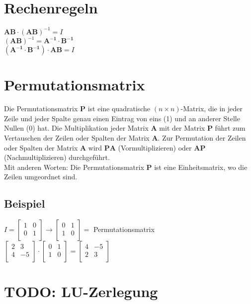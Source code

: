 \documentclass[../main.tex]{subfiles}
\begin{document}
\section{Rechenregeln}
$\mathbf{AB}\cdot(\mathbf{AB})^{-1}=I$ \\ [7pt]
$(\mathbf{AB})^{-1} = \mathbf{A^{-1} \cdot B^{-1}}$ \\ [7pt]
$(\mathbf{A^{-1} \cdot B^{-1}})\cdot \mathbf{AB} = I$

\section{Permutationsmatrix}
Die Permutationsmatrix $\mathbf{P}$ ist eine quadratische $(n\times n)$-Matrix, die in jeder Zeile und jeder
Spalte genau einen Eintrag von eins (1) und an anderer Stelle Nullen (0) hat. Die
Multiplikation jeder Matrix $\mathbf{A}$ mit der Matrix $\mathbf{P}$ führt zum Vertauschen der Zeilen oder Spalten
der Matrix $\mathbf{A}$. Zur Permutation der Zeilen oder Spalten der Matrix $\mathbf{A}$ wird $\mathbf{PA}$
(Vormultiplizieren) oder $\mathbf{AP}$ (Nachmultiplizieren) durchgeführt. \\
Mit anderen Worten: Die Permutationsmatrix $\mathbf{P}$ ist eine Einheitsmatrix, wo die Zeilen umgeordnet sind.

\subsection{Beispiel}
$I=\begin{bmatrix}
    1 & 0 \\
    0 & 1 \\
\end{bmatrix} \rightarrow
\begin{bmatrix}
    0 & 1 \\
    1 & 0 \\
\end{bmatrix} = $ Permutationsmatrix \\ [7pt]

$\begin{bmatrix}
    2 & 3 \\
    4 & -5 \\
\end{bmatrix} \cdot
\begin{bmatrix}
    0 & 1 \\
    1 & 0 \\
\end{bmatrix} = 
\begin{bmatrix}
    4 & -5 \\
    2 & 3 \\
\end{bmatrix}$

\section{TODO: LU-Zerlegung}
\end{document}
